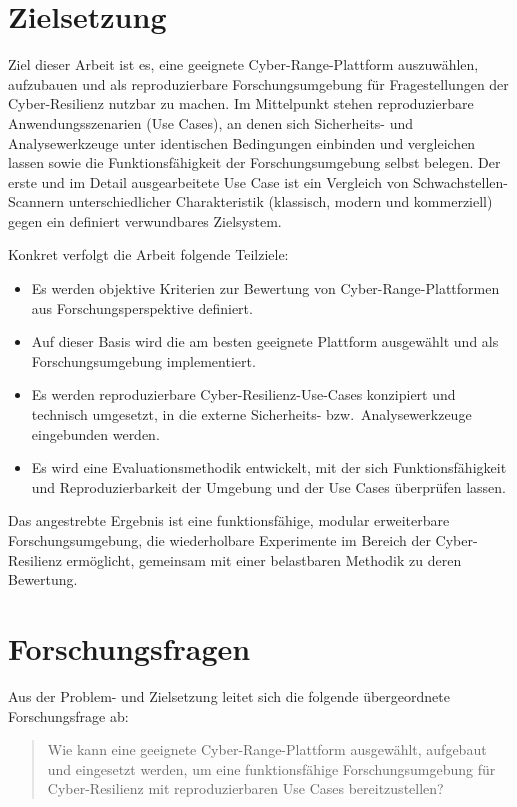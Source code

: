 \section{Zielsetzung}
\label{sec:zielsetzung}

Ziel dieser Arbeit ist es, eine geeignete Cyber-Range-Plattform auszuwählen, aufzubauen
und als reproduzierbare Forschungsumgebung für Fragestellungen der Cyber-Resilienz
nutzbar zu machen. Im Mittelpunkt stehen reproduzierbare Anwendungsszenarien (Use Cases),
an denen sich Sicherheits- und Analysewerkzeuge unter identischen Bedingungen einbinden
und vergleichen lassen sowie die Funktionsfähigkeit der Forschungsumgebung selbst belegen.
Der erste und im Detail ausgearbeitete Use Case ist ein Vergleich von Schwachstellen-Scannern
unterschiedlicher Charakteristik (klassisch, modern und kommerziell) gegen ein definiert
verwundbares Zielsystem.

Konkret verfolgt die Arbeit folgende Teilziele:
\begin{itemize}
  \item Es werden objektive Kriterien zur Bewertung von Cyber-Range-Plattformen aus
        Forschungsperspektive definiert.
  \item Auf dieser Basis wird die am besten geeignete Plattform ausgewählt und als
        Forschungsumgebung implementiert.
  \item Es werden reproduzierbare Cyber-Resilienz-Use-Cases konzipiert und technisch
        umgesetzt, in die externe Sicherheits- bzw.\ Analysewerkzeuge eingebunden werden.
  \item Es wird eine Evaluationsmethodik entwickelt, mit der sich Funktionsfähigkeit und
        Reproduzierbarkeit der Umgebung und der Use Cases überprüfen lassen.
\end{itemize}

Das angestrebte Ergebnis ist eine funktionsfähige, modular erweiterbare Forschungsumgebung,
die wiederholbare Experimente im Bereich der Cyber-Resilienz ermöglicht, gemeinsam mit einer
belastbaren Methodik zu deren Bewertung.

\section{Forschungsfragen}
\label{sec:forschungsfragen}

Aus der Problem- und Zielsetzung leitet sich die folgende übergeordnete Forschungsfrage ab:

\begin{quote}
Wie kann eine geeignete Cyber-Range-Plattform ausgewählt, aufgebaut und eingesetzt werden,
um eine funktionsfähige Forschungsumgebung für Cyber-Resilienz mit reproduzierbaren Use
Cases bereitzustellen?
\end{quote}

